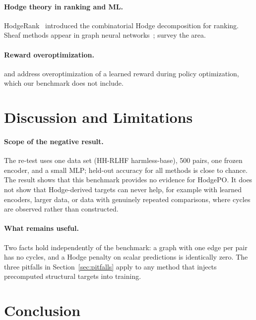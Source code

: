 \documentclass{article}
\begin{document}
\paragraph{Hodge theory in ranking and ML.} HodgeRank~\citep{jiang2011statistical} introduced the combinatorial Hodge decomposition for ranking. Sheaf methods appear in graph neural networks~\citep{bodnar2022neural}; \citet{ayzenberg2025sheaf} survey the area.

\paragraph{Reward overoptimization.} \citet{moskovitz2024confronting} and \citet{coste2024reward} address overoptimization of a learned reward during policy optimization, which our benchmark does not include.

\section{Discussion and Limitations}
\label{sec:discussion}

\paragraph{Scope of the negative result.} The re-test uses one data set (HH-RLHF harmless-base), 500 pairs, one frozen encoder, and a small MLP; held-out accuracy for all methods is close to chance. The result shows that this benchmark provides no evidence for HodgePO. It does not show that Hodge-derived targets can never help, for example with learned encoders, larger data, or data with genuinely repeated comparisons, where cycles are observed rather than constructed.

\paragraph{What remains useful.} Two facts hold independently of the benchmark: a graph with one edge per pair has no cycles, and a Hodge penalty on scalar predictions is identically zero. The three pitfalls in Section~\ref{sec:pitfalls} apply to any method that injects precomputed structural targets into training.

\section{Conclusion}
\label{sec:conclusion}
\end{document}

